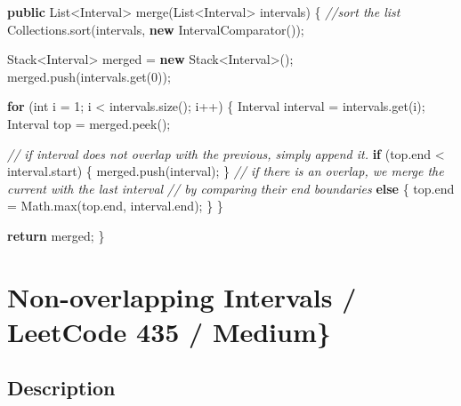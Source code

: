 \documentclass[]{book}
\newenvironment{Shaded}{\begin{snugshade}}{\end{snugshade}}
\newcommand{\BuiltInTok}[1]{#1}
\newcommand{\CommentTok}[1]{\textcolor[rgb]{0.56,0.35,0.01}{\textit{#1}}}
\newcommand{\DataTypeTok}[1]{\textcolor[rgb]{0.13,0.29,0.53}{#1}}
\newcommand{\DecValTok}[1]{\textcolor[rgb]{0.00,0.00,0.81}{#1}}
\newcommand{\FunctionTok}[1]{\textcolor[rgb]{0.00,0.00,0.00}{#1}}
\newcommand{\KeywordTok}[1]{\textcolor[rgb]{0.13,0.29,0.53}{\textbf{#1}}}
\newcommand{\NormalTok}[1]{#1}
\begin{document}
\begin{Shaded}
\begin{Highlighting}[]
\KeywordTok{public} \BuiltInTok{List}\NormalTok{<Interval> }\FunctionTok{merge}\NormalTok{(}\BuiltInTok{List}\NormalTok{<Interval> intervals) \{}
    \CommentTok{//sort the list}
    \BuiltInTok{Collections}\NormalTok{.}\FunctionTok{sort}\NormalTok{(intervals, }\KeywordTok{new} \FunctionTok{IntervalComparator}\NormalTok{());}

    \BuiltInTok{Stack}\NormalTok{<Interval> merged = }\KeywordTok{new} \BuiltInTok{Stack}\NormalTok{<Interval>();}
\NormalTok{    merged.}\FunctionTok{push}\NormalTok{(intervals.}\FunctionTok{get}\NormalTok{(}\DecValTok{0}\NormalTok{));}

    \KeywordTok{for}\NormalTok{ (}\DataTypeTok{int}\NormalTok{ i = }\DecValTok{1}\NormalTok{; i < intervals.}\FunctionTok{size}\NormalTok{(); i++) \{}
\NormalTok{        Interval interval = intervals.}\FunctionTok{get}\NormalTok{(i);}
\NormalTok{        Interval top = merged.}\FunctionTok{peek}\NormalTok{();}

        \CommentTok{// if interval does not overlap with the previous, simply append it.}
        \KeywordTok{if}\NormalTok{ (top.}\FunctionTok{end}\NormalTok{ < interval.}\FunctionTok{start}\NormalTok{) \{}
\NormalTok{            merged.}\FunctionTok{push}\NormalTok{(interval);}
\NormalTok{        \}}
        \CommentTok{// if there is an overlap, we merge the current with the last interval}
        \CommentTok{// by comparing their end boundaries}
        \KeywordTok{else}\NormalTok{ \{}
\NormalTok{            top.}\FunctionTok{end}\NormalTok{ = }\BuiltInTok{Math}\NormalTok{.}\FunctionTok{max}\NormalTok{(top.}\FunctionTok{end}\NormalTok{, interval.}\FunctionTok{end}\NormalTok{);}
\NormalTok{        \}}
\NormalTok{    \}}

    \KeywordTok{return}\NormalTok{ merged;}
\NormalTok{\}}
\end{Highlighting}
\end{Shaded}

\hypertarget{non-overlapping-intervals-leetcode-435-medium}{%
\section{Non-overlapping Intervals / LeetCode 435 / Medium\}}\label{non-overlapping-intervals-leetcode-435-medium}}

\hypertarget{description-19}{%
\subsection{Description}\label{description-19}}
\end{document}
